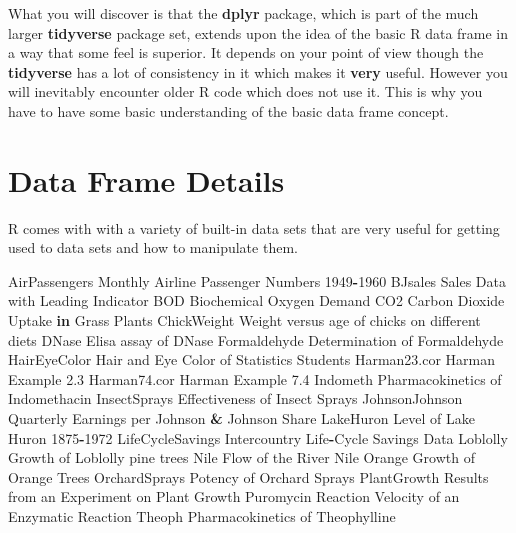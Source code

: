 \documentclass[]{book}
\newenvironment{Shaded}{\begin{snugshade}}{\end{snugshade}}
\newcommand{\DecValTok}[1]{\textcolor[rgb]{0.00,0.00,0.81}{#1}}
\newcommand{\FloatTok}[1]{\textcolor[rgb]{0.00,0.00,0.81}{#1}}
\newcommand{\StringTok}[1]{\textcolor[rgb]{0.31,0.60,0.02}{#1}}
\newcommand{\ControlFlowTok}[1]{\textcolor[rgb]{0.13,0.29,0.53}{\textbf{#1}}}
\newcommand{\OperatorTok}[1]{\textcolor[rgb]{0.81,0.36,0.00}{\textbf{#1}}}
\newcommand{\NormalTok}[1]{#1}
\begin{document}
What you will discover is that the \textbf{dplyr} package, which is part
of the much larger \textbf{tidyverse} package set, extends upon the idea
of the basic R data frame in a way that some feel is superior. It
depends on your point of view though the \textbf{tidyverse} has a lot of
consistency in it which makes it \textbf{very} useful. However you will
inevitably encounter older R code which does not use it. This is why you
have to have some basic understanding of the basic data frame concept.

\chapter{Data Frame Details}\label{data-frame-details}

R comes with with a variety of built-in data sets that are very useful
for getting used to data sets and how to manipulate them.

\begin{Shaded}
\begin{Highlighting}[]
\NormalTok{AirPassengers           Monthly Airline Passenger Numbers }\DecValTok{1949}\OperatorTok{-}\DecValTok{1960}
\NormalTok{BJsales                 Sales Data with Leading Indicator}
\NormalTok{BOD                     Biochemical Oxygen Demand}
\NormalTok{CO2                     Carbon Dioxide Uptake }\ControlFlowTok{in}\NormalTok{ Grass Plants}
\NormalTok{ChickWeight             Weight versus age of chicks on different diets}
\NormalTok{DNase                   Elisa assay of DNase}
\NormalTok{Formaldehyde            Determination of Formaldehyde}
\NormalTok{HairEyeColor            Hair and Eye Color of Statistics Students}
\NormalTok{Harman23.cor            Harman Example }\FloatTok{2.3}
\NormalTok{Harman74.cor            Harman Example }\FloatTok{7.4}
\NormalTok{Indometh                Pharmacokinetics of Indomethacin}
\NormalTok{InsectSprays            Effectiveness of Insect Sprays}
\NormalTok{JohnsonJohnson          Quarterly Earnings per Johnson }\OperatorTok{&}\StringTok{ }\NormalTok{Johnson Share}
\NormalTok{LakeHuron               Level of Lake Huron }\DecValTok{1875}\OperatorTok{-}\DecValTok{1972}
\NormalTok{LifeCycleSavings        Intercountry Life}\OperatorTok{-}\NormalTok{Cycle Savings Data}
\NormalTok{Loblolly                Growth of Loblolly pine trees}
\NormalTok{Nile                    Flow of the River Nile}
\NormalTok{Orange                  Growth of Orange Trees}
\NormalTok{OrchardSprays           Potency of Orchard Sprays}
\NormalTok{PlantGrowth             Results from an Experiment on Plant Growth}
\NormalTok{Puromycin               Reaction Velocity of an Enzymatic Reaction}
\NormalTok{Theoph                  Pharmacokinetics of Theophylline}
\end{Highlighting}
\end{Shaded}
\end{document}
